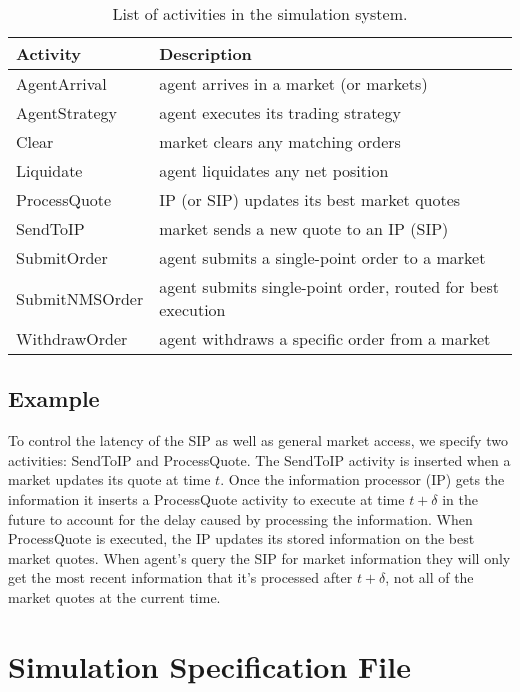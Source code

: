 \documentclass[11pt]{article}
\begin{document}
\begin{table}
\centering
\begin{tabular}{l l} \toprule
\textbf{Activity} 	& \textbf{Description} \\ \midrule
\textsf{AgentArrival} 	& agent arrives in a market (or markets) \\
\textsf{AgentStrategy} 	& agent executes its trading strategy \\
\textsf{Clear} 		& market clears any matching orders \\
\textsf{Liquidate}	& agent liquidates any net position \\
\textsf{ProcessQuote} 	& IP (or SIP) updates its best market quotes \\
\textsf{SendToIP} 	& market sends a new quote to an IP (SIP) \\
\textsf{SubmitOrder} 	& agent submits a single-point order to a market \\
\textsf{SubmitNMSOrder} 	& agent submits single-point order, routed for best execution \\
\textsf{WithdrawOrder} 	& agent withdraws a specific order from a market \\ \bottomrule
\end{tabular}
\caption{List of activities in the simulation system.}
\label{tab:activity}
\end{table}

\subsection{Example}

To control the latency of the SIP as well as general market access, we specify
two activities: \textsf{SendToIP} and \textsf{ProcessQuote}.  The
\textsf{SendToIP} activity is inserted when a market updates its quote at time
$t$. Once the information processor (IP) gets the information it inserts a
\textsf{ProcessQuote} activity to execute at time $t + \delta$ in the future to
account for the delay caused by processing the information.
%
When \textsf{ProcessQuote} is executed, the IP updates its stored information on
the best market quotes. When agent's query the SIP for market information they
will only get the most recent information that it's processed after $t+\delta$,
not all of the market quotes at the current time.

\section{Simulation Specification File}
\end{document}
